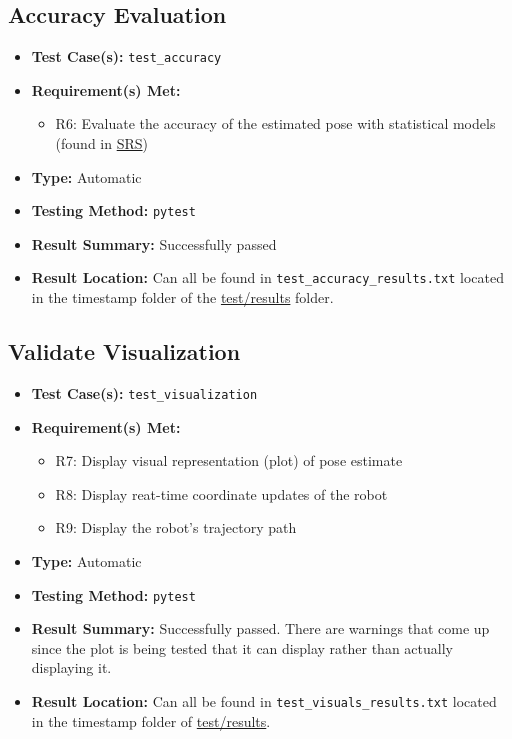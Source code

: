 \documentclass[12pt, titlepage]{article}
\begin{document}
\subsection{Accuracy Evaluation}
\begin{itemize}
  \item \textbf{Test Case(s): }\texttt{test\_accuracy}
  \item \textbf{Requirement(s) Met: }
  \begin{itemize}
    \item R6: Evaluate the accuracy of the estimated pose with statistical models (found in \href{https://github.com/AliyahJimoh/2D-Localizer/blob/main/docs/SRS/SRS.pdf}{SRS})
  \end{itemize}
  \item \textbf{Type: }Automatic
  \item \textbf{Testing Method: }\texttt{pytest}
  \item \textbf{Result Summary: }Successfully passed
  \item \textbf{Result Location: }Can all be found in \texttt{test\_accuracy\_results.txt} located in the timestamp folder of the \href{https://github.com/AliyahJimoh/2D-Localizer/tree/main/test/results/}{test/results} folder.
\end{itemize}

\subsection{Validate Visualization}
\begin{itemize}
  \item \textbf{Test Case(s): }\texttt{test\_visualization}
  \item \textbf{Requirement(s) Met: }
  \begin{itemize}
    \item R7: Display visual representation (plot) of pose estimate
    \item R8: Display reat-time coordinate updates of the robot
    \item R9: Display the robot's trajectory path
  \end{itemize}
  \item \textbf{Type: }Automatic
  \item \textbf{Testing Method: }\texttt{pytest}
  \item \textbf{Result Summary: }Successfully passed. There are warnings that come up since the plot is being tested that it can display rather than actually displaying it.
  \item \textbf{Result Location: }Can all be found in \texttt{test\_visuals\_results.txt} located in the timestamp folder of \href{https://github.com/AliyahJimoh/2D-Localizer/tree/main/test/results/}{test/results}.
\end{itemize}
\end{document}
